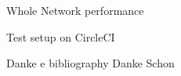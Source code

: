 \documentclass{beamer}
\begin{document}
\begin{frame}{Whole Network performance}

    
\end{frame}

\begin{frame}{Test setup on CircleCI}

    
\end{frame}

\begin{frame}{Danke e bibliography}
\centering
Danke Schon

    
\end{frame}
\end{document}
